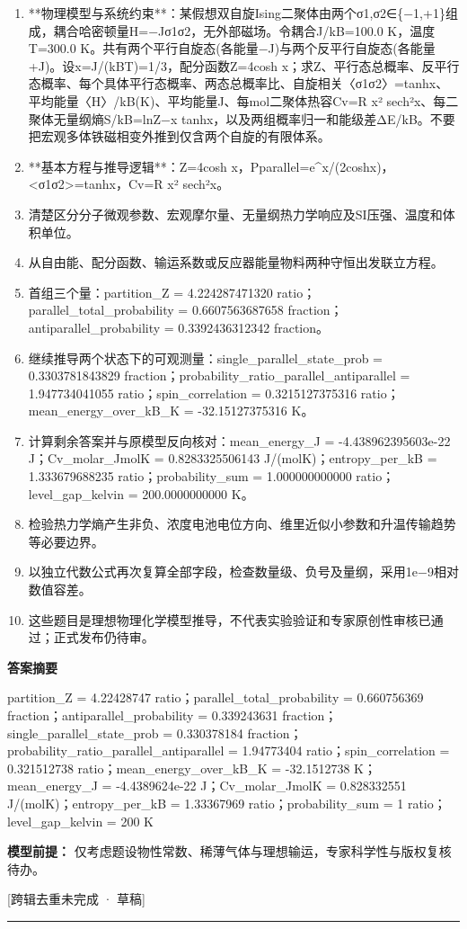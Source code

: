\documentclass[UTF8,11pt,a4paper]{ctexart}
\begin{document}
\begin{enumerate}
\item **物理模型与系统约束**：某假想双自旋Ising二聚体由两个σ1,σ2∈\{−1,+1\}组成，耦合哈密顿量H=−Jσ1σ2，无外部磁场。令耦合J/kB=100.0 K，温度T=300.0 K。共有两个平行自旋态(各能量−J)与两个反平行自旋态(各能量+J)。设x=J/(kBT)=1/3，配分函数Z=4cosh x；求Z、平行态总概率、反平行态概率、每个具体平行态概率、两态总概率比、自旋相关〈σ1σ2〉=tanhx、平均能量〈H〉/kB(K)、平均能量J、每mol二聚体热容Cv=R x² sech²x、每二聚体无量纲熵S/kB=lnZ−x tanhx，以及两组概率归一和能级差ΔE/kB。不要把宏观多体铁磁相变外推到仅含两个自旋的有限体系。
\item **基本方程与推导逻辑**：Z=4cosh x，Pparallel=e\textasciicircum{}x/(2coshx)，<σ1σ2>=tanhx，Cv=R x² sech²x。
\item 清楚区分分子微观参数、宏观摩尔量、无量纲热力学响应及SI压强、温度和体积单位。
\item 从自由能、配分函数、输运系数或反应器能量物料两种守恒出发联立方程。
\item 首组三个量：partition\_Z = 4.224287471320 ratio；parallel\_total\_probability = 0.6607563687658 fraction；antiparallel\_probability = 0.3392436312342 fraction。
\item 继续推导两个状态下的可观测量：single\_parallel\_state\_prob = 0.3303781843829 fraction；probability\_ratio\_parallel\_antiparallel = 1.947734041055 ratio；spin\_correlation = 0.3215127375316 ratio；mean\_energy\_over\_kB\_K = -32.15127375316 K。
\item 计算剩余答案并与原模型反向核对：mean\_energy\_J = -4.438962395603e-22 J；Cv\_molar\_JmolK = 0.8283325506143 J/(molK)；entropy\_per\_kB = 1.333679688235 ratio；probability\_sum = 1.000000000000 ratio；level\_gap\_kelvin = 200.0000000000 K。
\item 检验热力学熵产生非负、浓度电池电位方向、维里近似小参数和升温传输趋势等必要边界。
\item 以独立代数公式再次复算全部字段，检查数量级、负号及量纲，采用1e−9相对数值容差。
\item 这些题目是理想物理化学模型推导，不代表实验验证和专家原创性审核已通过；正式发布仍待审。
\end{enumerate}
\noindent\textbf{答案摘要}\par
partition\_Z = 4.22428747 ratio；parallel\_total\_probability = 0.660756369 fraction；antiparallel\_probability = 0.339243631 fraction；single\_parallel\_state\_prob = 0.330378184 fraction；probability\_ratio\_parallel\_antiparallel = 1.94773404 ratio；spin\_correlation = 0.321512738 ratio；mean\_energy\_over\_kB\_K = -32.1512738 K；mean\_energy\_J = -4.4389624e-22 J；Cv\_molar\_JmolK = 0.828332551 J/(molK)；entropy\_per\_kB = 1.33367969 ratio；probability\_sum = 1 ratio；level\_gap\_kelvin = 200 K\par
\noindent\textbf{模型前提：}
仅考虑题设物性常数、稀薄气体与理想输运，专家科学性与版权复核待办。\par
\noindent\textcolor{red!65!black}{[跨辑去重未完成 · 草稿]} \par
\medskip\hrule\medskip
{}
\end{document}

